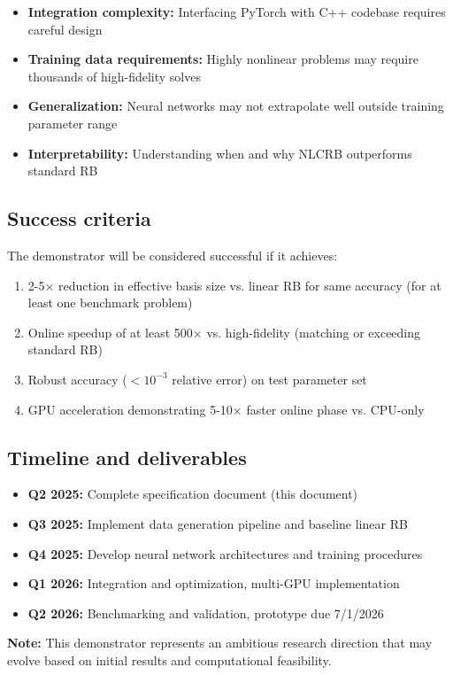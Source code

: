 \begin{itemize}
\item \textbf{Integration complexity:} Interfacing PyTorch with \Feelpp C++ codebase requires careful design
\item \textbf{Training data requirements:} Highly nonlinear problems may require thousands of high-fidelity solves
\item \textbf{Generalization:} Neural networks may not extrapolate well outside training parameter range
\item \textbf{Interpretability:} Understanding when and why NLCRB outperforms standard RB
\end{itemize}



\subsection{Success criteria}

The demonstrator will be considered successful if it achieves:
\begin{enumerate}
\item 2-5× reduction in effective basis size vs. linear RB for same accuracy (for at least one benchmark problem)
\item Online speedup of at least 500× vs. high-fidelity (matching or exceeding standard RB)
\item Robust accuracy ($< 10^{-3}$ relative error) on test parameter set
\item GPU acceleration demonstrating 5-10× faster online phase vs. CPU-only
\end{enumerate}



\subsection{Timeline and deliverables}

\begin{itemize}
\item \textbf{Q2 2025:} Complete specification document (this document)
\item \textbf{Q3 2025:} Implement data generation pipeline and baseline linear RB
\item \textbf{Q4 2025:} Develop neural network architectures and training procedures
\item \textbf{Q1 2026:} Integration and optimization, multi-GPU implementation
\item \textbf{Q2 2026:} Benchmarking and validation, prototype due 7/1/2026
\end{itemize}

\textbf{Note:} This demonstrator represents an ambitious research direction that may evolve based on initial results and computational feasibility.


